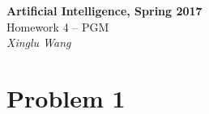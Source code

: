 \documentclass{mcmthesis}
\begin{document}
\begin{center}
	\textbf{\LARGE{Artificial Intelligence, Spring 2017}} \\
	\vspace{0.2em}
	\large{Homework 4 -- PGM} \\
	\vspace{1em}
	{\itshape Xinglu Wang}  
\end{center}
\section{Problem 1}
\end{document}
